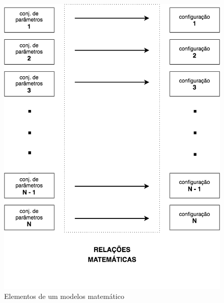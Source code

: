 \begin{figure}[!htb]
	\caption{Elementos de um modelos matemático}\label{fig:modelo_matematico}
	\begin{center}
		\includegraphics[scale=0.50]{imagens/modelo_matematico}
	\end{center}
\end{figure}








